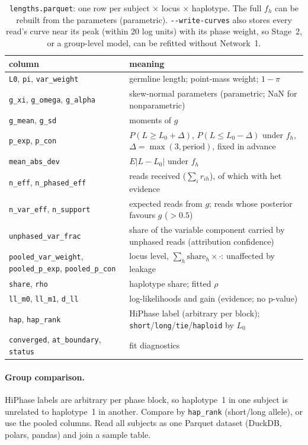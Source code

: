 \documentclass[10pt,a4paper]{article}
\newcommand{\opt}[1]{\texttt{-{}-#1}}
\begin{document}
\begin{table}[H]
\centering\small
\begin{tabularx}{\textwidth}{@{}l L@{}}
\toprule
column & meaning\\
\midrule
\texttt{L0}, \texttt{pi}, \texttt{var\_weight} & germline length; point-mass weight; $1-\pi$\\
\texttt{g\_xi}, \texttt{g\_omega}, \texttt{g\_alpha} & skew-normal parameters (parametric; NaN for nonparametric)\\
\texttt{g\_mean}, \texttt{g\_sd} & moments of $g$\\
\texttt{p\_exp}, \texttt{p\_con} & $P(L\geq L_0+\Delta)$, $P(L\leq L_0-\Delta)$ under $f_h$, $\Delta=\max(3,\text{period})$, fixed in advance\\
\texttt{mean\_abs\_dev} & $E|L-L_0|$ under $f_h$\\
\texttt{n\_eff}, \texttt{n\_phased\_eff} & reads received ($\sum_i r_{ih}$), of which with het evidence\\
\texttt{n\_var\_eff}, \texttt{n\_support} & expected reads from $g$; reads whose posterior favours $g$ ($>0.5$)\\
\texttt{unphased\_var\_frac} & share of the variable component carried by unphased reads (attribution confidence)\\
\texttt{pooled\_var\_weight}, \texttt{pooled\_p\_exp}, \texttt{pooled\_p\_con} & locus level, $\sum_h \text{share}_h\times\cdot$: unaffected by leakage\\
\texttt{share}, \texttt{rho} & haplotype share; fitted $\rho$\\
\texttt{ll\_m0}, \texttt{ll\_m1}, \texttt{d\_ll} & log-likelihoods and gain (evidence; no p-value)\\
\texttt{hap}, \texttt{hap\_rank} & HiPhase label (arbitrary per block); \texttt{short}/\texttt{long}/\texttt{tie}/\texttt{haploid} by $L_0$\\
\texttt{converged}, \texttt{at\_boundary}, \texttt{status} & fit diagnostics\\
\bottomrule
\end{tabularx}
\caption{\texttt{lengths.parquet}: one row per subject $\times$ locus $\times$ haplotype. The full $f_h$ can be rebuilt
from the parameters (parametric). \opt{write-curves} also stores every read's curve near its peak (within 20 log
units) with its phase weight, so Stage~2, or a group-level model, can be refitted without Network~1.}
\end{table}

\paragraph{Group comparison.} HiPhase labels are arbitrary per phase block, so haplotype~1 in one subject is
unrelated to haplotype~1 in another. Compare by \texttt{hap\_rank} (short/long allele), or use the pooled
columns. Read all subjects as one Parquet dataset (DuckDB, polars, pandas) and join a sample table.
\end{document}
